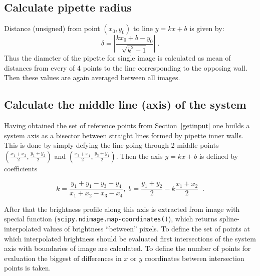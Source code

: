\subsection{Calculate pipette radius}\label{calcpiprad}

Distance (unsigned) from point $\left(x_0,y_0\right)$ to line $y=kx+b$ is given by:
\begin{equation}
\delta = \left|\frac{kx_0+b-y_0}{\sqrt{k^2-1}}\right|\;.
\label{eq:pointtoline}
\end{equation}
Thus the diameter of the pipette for single image is calculated as mean of distances from every of 4 points to the line corresponding to the opposing wall. Then these values are again averaged between all images.

\subsection{Calculate the middle line (axis) of the system}\label{calcaxis}

Having obtained the set of reference points from Section~\ref{getinput} one builds a system axis as a bisector between straight lines formed by pipette inner walls. This is done by simply defying the line going through 2 middle points $\left(\frac{x_1+x_2}{2}, \frac{y_1+y_2}{2}\right)$ and $\left(\frac{x_3+x_4}{2}, \frac{y_3+y_4}{2}\right)$. Then the axis $y = kx+b$ is defined by coefficients

\begin{equation}
k = \frac{y_1+y_1-y_3-y_4}{x_1+x_2-x_3-x_4}, \; b = \frac{y_1+y_2}{2} - k\frac{x_1+x_2}{2}\;\;.
\label{eq:axis}
\end{equation}

After that the brightness profile along this axis is extracted from image with special function (\verb|scipy.ndimage.map-coordinates()|), which returns spline-interpolated values of brightness ``between'' pixels. To define the set of points at which interpolated brightness should be evaluated first intersections of the system axis with boundaries of image are calculated. To define the number of points for evaluation the biggest of differences in $x$ or $y$ coordinates between intersection points is taken.

